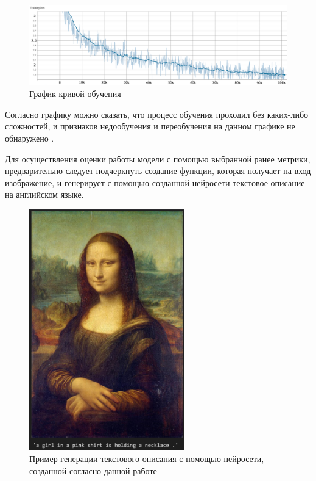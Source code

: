 \documentclass[bachelor, och, coursework]{SCWorks}
\begin{document}
        \begin{figure}[H]
            \centering
            \includegraphics[width=1\textwidth]{pics/curve.png}
            \caption{График кривой обучения}
        \end{figure}

        Согласно графику можно сказать, что процесс обучения проходил без
        каких-либо сложностей, и признаков недообучения и переобучения на данном
        графике не обнаружено \cite{fitting}.

        Для осуществления оценки работы модели с помощью выбранной ранее
        метрики, предварительно следует подчеркнуть создание функции, которая
        получает на вход изображение, и генерирует с помощью созданной нейросети
        текстовое описание на английском языке.

        \begin{figure}[H]
            \centering
            \includegraphics[width=0.6\textwidth]{pics/caption.png}
            \caption{Пример генерации текстового описания с помощью нейросети,
                     созданной согласно данной работе}
        \end{figure}
\end{document}
